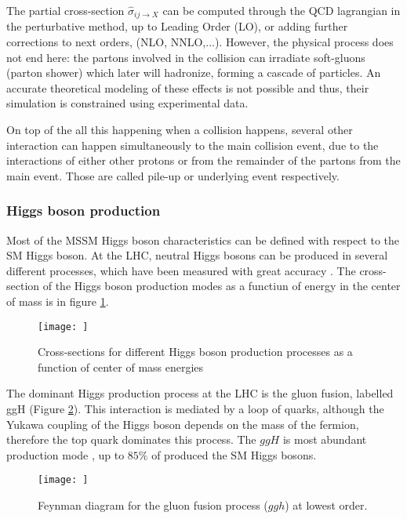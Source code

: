 The partial cross-section $\hat{\sigma}_{ij \rightarrow X}$ can be computed through the QCD lagrangian in the perturbative method, up to Leading Order (LO), or adding further corrections to next orders, (NLO, NNLO,...). However, the physical process does not end here: the partons involved in the collision can irradiate soft-gluons (parton shower) which later will hadronize, forming a cascade of particles. An accurate theoretical modeling of these effects is not possible and thus, their simulation is constrained using experimental data.

On top of the all this happening when a collision happens, several other interaction can happen simultaneously to the main collision event, due to the interactions of either other protons or from the remainder of the partons from the main event. Those are called pile-up or underlying event respectively.

\subsubsection{Higgs boson production}

Most of the MSSM Higgs boson characteristics can be defined with respect to the SM Higgs boson. At the LHC, neutral Higgs bosons can be produced in several different processes, which have been measured with great accuracy \cite{Dittmaier:1318996}. The cross-section of the Higgs boson production modes as a functiun of energy in the center of mass is in figure \ref{fig:higgscrosssec}.

\begin{figure}
    \centering
    \texttt{[image: ]}
    \caption{Cross-sections for different Higgs boson production processes as a function of center of mass energies}
    \label{fig:higgscrosssec}
\end{figure}

The dominant Higgs production process at the LHC is the gluon fusion, labelled ggH (Figure \ref{fig:ggh}). This interaction is mediated by a loop of quarks, although the Yukawa coupling of the Higgs boson depends on the mass of the fermion, therefore the top quark dominates this process. The $ggH$ is most abundant production mode , up to $85\%$ of produced the SM Higgs bosons.


\begin{figure}
    \centering
    \texttt{[image: ]}
    \caption{Feynman diagram for the gluon fusion process ($ggh$) at lowest order.}
    \label{fig:ggh}
\end{figure}



